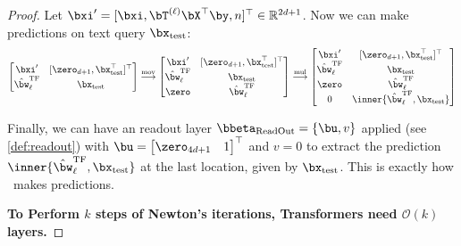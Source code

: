 \begin{proof}
Let $\bxi' = [\bxi,\bT^{(\ell)} \bX^\top \by,n ]^\top \in \mathbb R^{2d+1}$. Now we can make predictions on text query $\bx_\mathrm{test}$:
\begin{equation}
    \begin{bmatrix}
        \bxi' &  [\zero_{d+1}, \bx_\mathrm{test}^\top]^\top \\
        \hat{\bw}_\ell^\mathrm{TF} & \bx_\mathrm{test}
    \end{bmatrix} \overset{\mathrm{mov}}{\longrightarrow} \begin{bmatrix}
        \bxi' &  [\zero_{d+1}, \bx_\mathrm{test}^\top]^\top \\
        \hat{\bw}_\ell^\mathrm{TF} & \bx_\mathrm{test} \\
        \zero & \hat{\bw}_\ell^\mathrm{TF}
    \end{bmatrix} \overset{\mathrm{mul}}{\longrightarrow} \begin{bmatrix}
        \bxi' &  [\zero_{d+1}, \bx_\mathrm{test}^\top]^\top \\
        \hat{\bw}_\ell^\mathrm{TF} & \bx_\mathrm{test} \\
        \zero & \hat{\bw}_\ell^\mathrm{TF} \\
        0 & \inner{\hat{\bw}_\ell^\mathrm{TF}, \bx_\mathrm{test}}
    \end{bmatrix}
\end{equation}

Finally, we can have an readout layer $\bbeta_\mathrm{ReadOut} = \{\bu, v\}$ applied (see \cref{def:readout}) with $\bu = \begin{bmatrix}
    \zero_{4d+1} & 1 
\end{bmatrix}^\top$ and $v = 0$ to extract the prediction $ \inner{\hat{\bw}_\ell^\mathrm{TF}, \bx_\mathrm{test}}$ at the last location, given by $\bx_\mathrm{test}$. This is exactly how \newton\ makes predictions. 

\textbf{To Perform $k$ steps of Newton's iterations, Transformers need $\mathcal O(k)$ layers.}


\end{proof}
